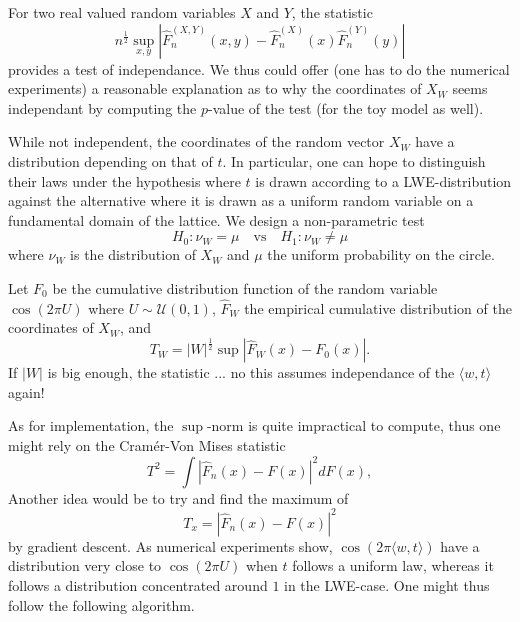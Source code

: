 \documentclass{article}
\begin{document}
For two real valued random variables $X$ and $Y$, the statistic 
$$ n^{\frac{1}{2}}\sup_{x,y}|\hat F_n^{(X,Y)}(x,y) - \hat F_n^{(X)}(x) \hat F_n^{(Y)}(y)|$$
provides a test of independance. We thus could offer (one has to do the numerical experiments) a reasonable explanation as to why the coordinates of $X_W$ seems independant by computing the $p$-value of the test (for the toy model as well).

While not independent, the coordinates of the random vector $X_W$ have a distribution depending on that of $t$. In particular, one can hope to distinguish their laws under the hypothesis where $t$ is drawn according to a LWE-distribution against the alternative where it is drawn as a uniform random variable on a fundamental domain of the lattice. We design a non-parametric test 
$$ H_0 : \nu_W = \mu \quad \text{vs} \quad H_1 : \nu_W \neq \mu $$ 
where $\nu_W $ is the distribution of $X_W$ and $\mu$ the uniform probability on the circle. 

Let $F_0$ be the cumulative distribution function of the random variable $\cos(2\pi U)$ where $U\sim \mathcal U(0,1)$, $\hat F_W$ the empirical cumulative distribution of the coordinates of $X_W$, and
$$T_W = |W|^{\frac{1}{2}}\sup |\hat F_W(x) - F_0(x)|.$$
If $|W|$ is big enough, the statistic ... no this assumes independance of the $\langle w , t \rangle $ again!

As for implementation, the $\sup$-norm is quite impractical to compute, thus one might rely on the Cramér-Von Mises statistic
$$T^2 = \int |\hat F_n(x) -F(x)|^2 dF(x),$$
Another idea would be to try and find the maximum of 
$$T_x = |\hat F_n(x) -F(x)|^2 $$
by gradient descent. As numerical experiments show, $\cos(2 \pi\langle w , t\rangle)$ have a distribution very close to $\cos(2\pi U)$ when $t$ follows a uniform law, whereas it follows a distribution concentrated around $1$ in the LWE-case. One might thus follow the following algorithm.

\begin{center}
\end{center}
\end{document}
